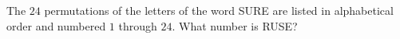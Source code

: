 The $24$ permutations of the letters of the word SURE are listed in alphabetical order and numbered $1$ through $24$. What number is RUSE?
